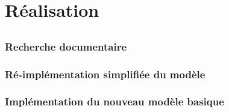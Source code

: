 \chapter{Réalisation}



\section{} %



\section{}
\subsection{Recherche documentaire} %
\subsection{Ré-implémentation simplifiée du modèle } %
\subsection{Implémentation du nouveau modèle basique} %
